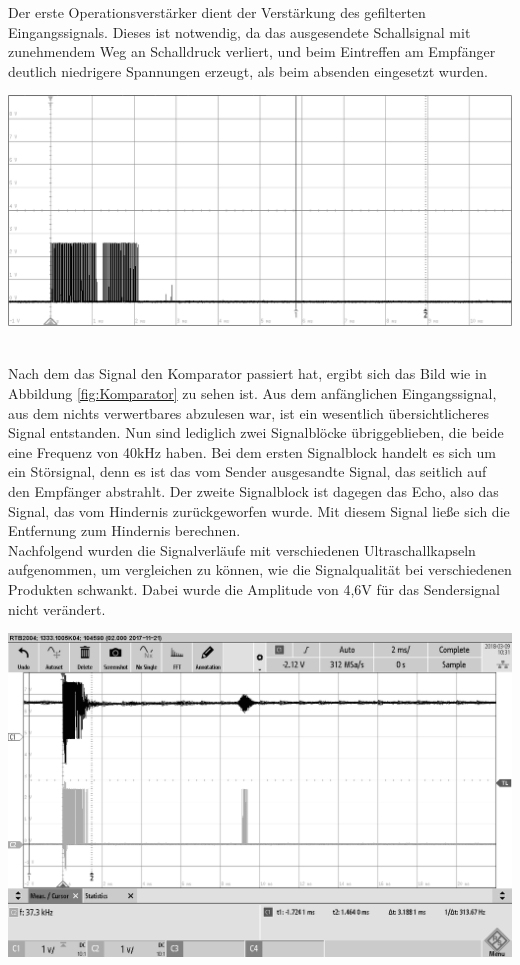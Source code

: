 Der erste Operationsverstärker dient der Verstärkung des gefilterten Eingangssignals. Dieses ist notwendig, da das ausgesendete Schallsignal mit zunehmendem Weg an Schalldruck verliert, und beim Eintreffen am Empfänger deutlich niedrigere Spannungen erzeugt, als beim absenden eingesetzt wurden. \\
\begin{minipage}{0.5\textwidth}
\includegraphics[width=1\textwidth, draft
]{Abbildungen/MessungenP1/Signal-nach-Komparator.png}\label{fig:Komparator}
\end{minipage}\\
Nach dem das Signal den Komparator passiert hat, ergibt sich das Bild wie in Abbildung \ref{fig:Komparator} zu sehen ist. Aus dem anfänglichen Eingangssignal, aus dem nichts verwertbares abzulesen war, ist ein wesentlich übersichtlicheres Signal entstanden. Nun sind lediglich zwei Signalblöcke übriggeblieben, die beide eine Frequenz von 40kHz haben. Bei dem ersten Signalblock handelt es sich um ein Störsignal, denn es ist das vom Sender ausgesandte Signal, das seitlich auf den Empfänger abstrahlt. Der zweite Signalblock ist dagegen das Echo, also das Signal, das vom Hindernis zurückgeworfen wurde. Mit diesem Signal ließe sich die Entfernung zum Hindernis berechnen.\\
Nachfolgend wurden die Signalverläufe mit verschiedenen Ultraschallkapseln aufgenommen, um vergleichen zu können, wie die Signalqualität bei verschiedenen Produkten schwankt. Dabei wurde die Amplitude von 4,6V für das Sendersignal nicht verändert.\\
\begin{minipage}{0.5\textwidth}
\includegraphics[width=1\textwidth, draft
]{Abbildungen/MessungenP2/4,6V/EKULIT1,5m.png}
\label{fig:EKULIT1,5m}
\end{minipage}
